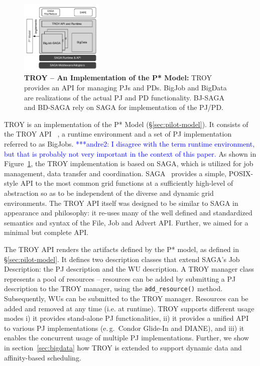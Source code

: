 \documentclass[conference,final]{IEEEtran}
\newcommand{\jhanote}[1]{ {\textcolor{red} { ***shantenu: #1 }}}
\newcommand{\amnote}[1]{ {\textcolor{blue} { ***andre2: #1 }}}
\newcommand{\amnote}[1]{}
\newcommand{\jhanote}[1]{}
\newcommand{\up}{\vspace*{-1em}}
\begin{document}

\begin{figure}[t]
	\centering
		\includegraphics[width=0.35\textwidth]{figures/pstar_troy.pdf}
	\caption{\textbf{TROY -- An Implementation of the P* Model:}  TROY provides 
	an API for managing PJs and PDs. BigJob and BigData are 
	realizations of the actual PJ and PD functionality. BJ-SAGA and BD-SAGA 
	rely on SAGA for implementation of the PJ/PD.\up\up
	}
	\label{fig:figures_pstar_troy}
\end{figure}

TROY is an implementation of the P* Model
(\S\ref{sec:pilot-model}).  
It consists of the TROY API ~\cite{troy}, a runtime
environment and a set of PJ implementation referred to as BigJobs. 
\amnote{I disagree with the term runtime environment, but that is
probably not very important in the context of this paper.}
As shown in Figure~\ref{fig:figures_pstar_troy}, the TROY
implementation is based on SAGA, which is utilized for job management,
data transfer and coordination.
SAGA~\cite{saga_url,saga_gfd90} provides a simple, POSIX-style API to
the most common grid functions at a sufficiently high-level of abstraction
so as to be independent of the diverse and dynamic grid environments.
The TROY API itself was designed to be similar to SAGA in
appearance and philosophy: it re-uses many of the well defined and
standardized semantics and syntax of the File, Job and Advert API.
Further, we aimed for a minimal but complete API.%

The TROY API renders the artifacts defined by the P* model, as defined
in \S\ref{sec:pilot-model}. It defines two description classes that
extend SAGA's Job Description: the PJ description and the WU
description. A TROY manager class represents a pool of resources --
resources can be added by submitting a PJ description to the TROY
manager, using the \texttt{add\_resource()} method. Subsequently, WUs
can be submitted to the TROY manager.  Resources can be added and
removed at any time (i.e. at runtime).  TROY supports different usage
modes i) it provides stand-alone PJ functionalities, ii) it provides a
unified API to various PJ implementations (e.\,g.\ Condor Glide-In and
DIANE), and iii) it enables the concurrent usage of multiple PJ
implementations. Further, we show in section~\ref{sec:bigdata} how
TROY is extended to support dynamic data and affinity-based
scheduling.
\end{document}
